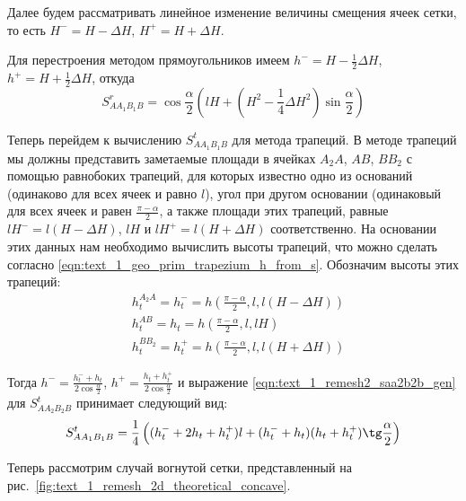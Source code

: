 Далее будем рассматривать линейное изменение величины смещения ячеек сетки, то есть $H^{-} = H - \Delta H$, $H^{+} = H + \Delta H$.

Для перестроения методом прямоугольников имеем $h^{-} = H - \frac{1}{2} \Delta H$, $h^{+} = H + \frac{1}{2} \Delta H$, откуда
\begin{equation}\label{eqn:text_1_remesh2_s_rect}
	S_{AA_1B_1B}^r = \cos \frac{\alpha}{2} \left( lH + \left( H^2 - \frac{1}{4} \Delta H^2 \right) \sin \frac{\alpha}{2} \right)
\end{equation}

Теперь перейдем к вычислению $S_{AA_1B_1B}^t$ для метода трапеций.
В методе трапеций мы должны представить заметаемые площади в ячейках $A_2A$, $AB$, $BB_2$ с помощью равнобоких трапеций, для которых известно одно из оснований (одинаково для всех ячеек и равно $l$), угол при другом основании (одинаковый для всех ячеек и равен $\frac{\pi - \alpha}{2}$, а также площади этих трапеций, равные $lH^{-} = l(H - \Delta H)$, $lH$ и $lH^{+} = l(H + \Delta H)$ соответственно.
На основании этих данных нам необходимо вычислить высоты трапеций, что можно сделать согласно \eqref{eqn:text_1_geo_prim_trapezium_h_from_s}.
Обозначим высоты этих трапеций:
\begin{equation}
	\begin{aligned}	
		& h_t^{A_2A} = h_t^{-} = h\left(\frac{\pi - \alpha}{2}, l, l(H - \Delta H)\right) \\ 
		& h_t^{AB} = h_t = h\left(\frac{\pi - \alpha}{2}, l, lH\right) \\
		& h_t^{BB_2} = h_t^{+} = h\left(\frac{\pi - \alpha}{2}, l, l(H + \Delta H)\right)
	\end{aligned}
\end{equation}

Тогда $h^{-} = \frac{h_t^{-} + h_t}{2 \cos \frac{\alpha}{2}}$, $h^{+} = \frac{h_t + h_t^{+}}{2 \cos \frac{\alpha}{2}}$ и выражение \eqref{eqn:text_1_remesh2_saa2b2b_gen} для $S_{AA_2B_2B}^t$ принимает следующий вид:
\begin{equation}\label{eqn:text_1_remesh2_trap}
	S_{AA_1B_1B}^t = \frac{1}{4} \left( (h_t^{-} + 2 h_t + h_t^{+})l + (h_t^{-} + h_t) (h_t + h_t^{+}) \tg \frac{\alpha}{2} \right)
\end{equation}

Теперь рассмотрим случай вогнутой сетки, представленный на рис.~\ref{fig:text_1_remesh_2d_theoretical_concave}.

